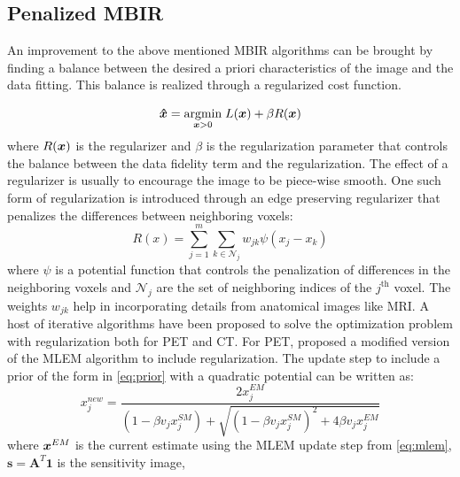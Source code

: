 \subsection{Penalized MBIR}
An improvement to the above mentioned \ac{MBIR} algorithms can be brought by finding a balance between the desired a priori characteristics of the image and the data fitting. This balance is realized through a regularized cost function.

\begin{equation}\label{eq:p_mbir}
\bm{\hat{x}}=\underset{\bm{x} > 0}{\operatorname{argmin}} \; L(\bm{x}) + \beta R(\bm{x})
\end{equation}
where $R(\bm{x})$ is the regularizer and $\beta$ is the regularization parameter that controls the balance between the data fidelity term and the regularization. The effect of a regularizer is usually to encourage the image to be piece-wise smooth.  
One such form of regularization is introduced through an edge preserving regularizer that penalizes the differences between neighboring voxels:
\begin{equation}\label{eq:prior}
R(x)=\sum_{j=1}^{m} \sum_{k \in \mathcal{N}_{j}} w_{j k} \psi \left(x_{j}-x_{k}\right)
\end{equation}
where $\psi$ is a potential function that controls the penalization of differences in the neighboring voxels and $\mathcal{N}_{j}$ are the set of neighboring indices of the $j^\mathrm{th}$ voxel. The weights $w_{jk}$ help in incorporating details from anatomical images like MRI. A host of iterative algorithms have been proposed to solve the optimization problem with regularization both for \ac{PET} and \ac{CT}. For \ac{PET}, \cite{depierro1995} proposed a modified version of the \ac{MLEM} algorithm to include regularization. The update step to include a prior of the form in \ref{eq:prior} with a quadratic potential can be written as:
\begin{equation}
x_{j}^{new}=\frac{2 x_{j}^{EM}}{\left(1-\beta v_{j} x_{j}^{S M}\right)+\sqrt{\left(1-\beta v_{j} x_{j}^{S M}\right)^{2}+4 \beta v_{j} x_{j}^{E M}}}
\end{equation}
where $\bm{x}^{EM}$ is the current estimate using the \ac{MLEM} update step from \ref{eq:mlem}, $\bm{s}=\bm{A}^T \bm{1}$ is the sensitivity image, 
